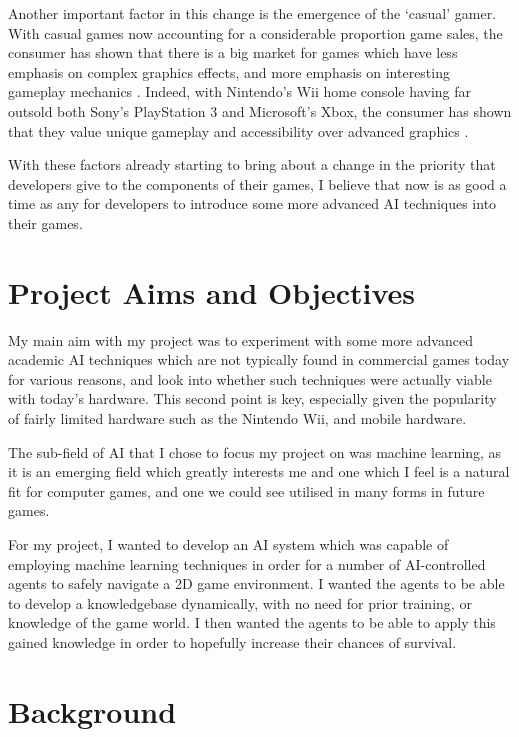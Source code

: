 \documentclass[a4paper,oneside]{report}
\begin{document}
Another important factor in this change is the emergence of the `casual' gamer. With casual games now accounting for a considerable proportion game sales, the consumer has shown that there is a big market for games which have less emphasis on complex graphics effects, and more emphasis on interesting gameplay mechanics \cite{Association:2011uq}. Indeed, with Nintendo's Wii home console having far outsold both Sony's PlayStation 3 and Microsoft's Xbox, the consumer has shown that they value unique gameplay and accessibility over advanced graphics \cite{:2012dq, Nintendo:2012nx, :cr}. 

With these factors already starting to bring about a change in the priority that developers give to the components of their games, I believe that now is as good a time as any for developers to introduce some more advanced AI techniques into their games.

\section{Project Aims and Objectives}

My main aim with my project was to experiment with some more advanced academic AI techniques which are not typically found in commercial games today for various reasons, and look into whether such techniques were actually viable with today's hardware. This second point is key, especially given the popularity of fairly limited hardware such as the Nintendo Wii, and mobile hardware.

The sub-field of AI that I chose to focus my project on was machine learning, as it is an emerging field which greatly interests me and one which I feel is a natural fit for computer games, and one we could see utilised in many forms in future games.

For my project, I wanted to develop an AI system which was capable of employing machine learning techniques in order for a number of AI-controlled agents to safely navigate a 2D game environment. I wanted the agents to be able to develop a knowledgebase dynamically, with no need for prior training, or knowledge of the game world. I then wanted the agents to be able to apply this gained knowledge in order to hopefully increase their chances of survival. 

\section{Background}
\end{document}
